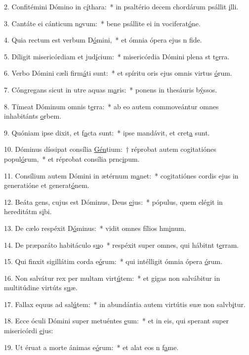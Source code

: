 2. Confitémini Dómino in c\uline{í}thara:~* in psaltério decem chordárum psállit \uline{i}lli.\par 
3. Cantáte ei cánticum n\uline{o}vum:~* bene psállite ei in vociferat\uline{ó}ne.\par 
4. Quia rectum est verbum D\uline{ó}mini,~* et ómnia ópera ejus n f\uline{i}de.\par 
5. Díligit misericórdiam et jud\uline{í}cium:~* misericórdia Dómini plena st t\uline{e}rra.\par 
6. Verbo Dómini cæli firm\uline{á}ti sunt:~* et spíritu oris ejus omnis virtus \uline{ó}rum.\par 
7. Cóngregans sicut in utre aquas m\uline{a}ris:~* ponens in thesáuris b\uline{ý}ssos.\par 
8. Tímeat Dóminum omnis t\uline{e}rra:~* ab eo autem commoveántur omnes inhabitánts \uline{o}rbem.\par 
9. Quóniam ipse dixit, et f\uline{a}cta sunt:~* ipse mandávit, et cret\uline{a} sunt.\par 
10. Dóminus díssipat consília \uline{Gén}tium:~† réprobat autem cogitatiónes popul\uline{ó}rum,~* et réprobat consília prnc\uline{i}pum.\par 
11. Consílium autem Dómini in ætérnum m\uline{a}net:~* cogitatiónes cordis ejus in generatióne et generat\uline{ó}nem.\par 
12. Beáta gens, cujus est Dóminus, Deus \uline{e}jus:~* pópulus, quem elégit in hereditátm s\uline{i}bi.\par 
13. De cælo respéxit D\uline{ó}minus:~* vidit omnes fílios hm\uline{i}num.\par 
14. De præparáto habitáculo s\uline{u}o~* respéxit super omnes, qui hábitnt t\uline{e}rram.\par 
15. Qui finxit sigillátim corda e\uline{ó}rum:~* qui intélligit ómnia ópera \uline{ó}rum.\par 
16. Non salvátur rex per multam virt\uline{ú}tem:~* et gigas non salvábitur in multitúdine virtúts s\uline{u}æ.\par 
17. Fallax equus ad sal\uline{ú}tem:~* in abundántia autem virtútis suæ non salvb\uline{i}tur.\par 
18. Ecce óculi Dómini super metuéntes \uline{e}um:~* et in eis, qui sperant super misericórdi \uline{e}jus:\par 
19. Ut éruat a morte ánimas e\uline{ó}rum:~* et alat eos n f\uline{a}me.\par 
